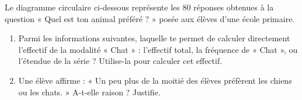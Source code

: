 \documentclass[../../syllabus_1.tex]{subfiles}
\begin{document}
\newpage
\begin{exercise}
    Le diagramme circulaire ci-dessous représente les $80$ réponses obtenues à la question « Quel est ton animal préféré ? » posée aux élèves d'une école primaire.
    \begin{center}
    \end{center}
    \begin{enumerate}[itemsep=1cm]
        \item Parmi les informations suivantes, laquelle te permet de calculer directement l'effectif de la modalité « Chat » : l'effectif total, la fréquence de « Chat », ou l'étendue de la série ? Utilise-la pour calculer cet effectif.
        \item Une élève affirme : « Un peu plus de la moitié des élèves préfèrent les chiens ou les chats. » A-t-elle raison ? Justifie.
        \vspace{0.4cm}
    \end{enumerate}
\end{exercise}
\end{document}

